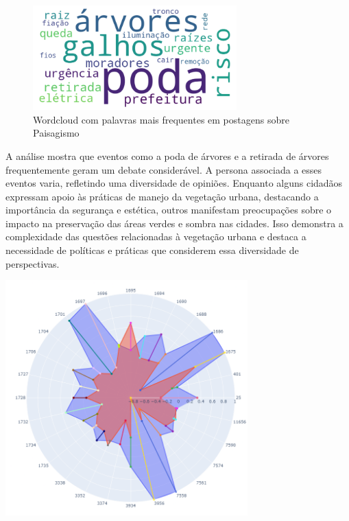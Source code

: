 \begin{figure}[htb]
	\centering
	\includegraphics[width=0.7\textwidth]{images/wordcloud_landscape.png}
	\caption{Wordcloud com palavras mais frequentes em postagens sobre Paisagismo}
	\label{fig:wordcloud_landscape}
\end{figure}

A análise mostra que eventos como a poda de árvores e a retirada de árvores frequentemente geram um debate considerável. A persona associada a esses eventos varia, refletindo uma diversidade de opiniões. Enquanto alguns cidadãos expressam apoio às práticas de manejo da vegetação urbana, destacando a importância da segurança e estética, outros manifestam preocupações sobre o impacto na preservação das áreas verdes e sombra nas cidades. Isso demonstra a complexidade das questões relacionadas à vegetação urbana e destaca a necessidade de políticas e práticas que considerem essa diversidade de perspectivas.

\begin{quadro}[htb]
	\centering
	\includegraphics[width=0.7\textwidth]{images/social_barometer_landscape.png}
	\caption{Gráfico de Radar ilustrando a pressão social em relação ao tópico de Paisagismo}
	\label{fig:social_barometer_landscape}
\end{quadro}

